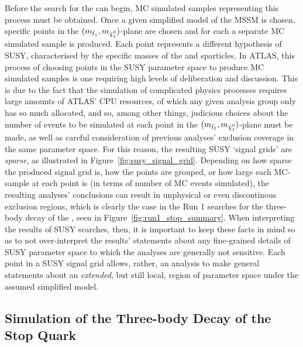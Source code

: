 Before the search for the \stopone can begin, MC simulated samples representing this process
must be obtained.
Once a given simplified model of the MSSM is chosen, specific points in the
$(m_{\stopone}, m_{\ninoone})$-plane are chosen and for each a separate MC simulated
sample is produced.
Each point represents a different hypothesis of SUSY, characterised by the specific masses
of the \stopone and \ninoone sparticles.
In ATLAS, this process of choosing points in the SUSY parameter space to produce MC simulated samples
is one requiring high levels of deliberation and discussion.
This is due to the fact that the simulation of complicated physics processes requires large amounts
of ATLAS' CPU resources, of which any given analysis group only has so much allocated, and so, among other things,
judicious choices about the number of events to be simulated at each point in the $(m_{\stopone}, m_{\ninoone})$-plane
must be made, as well as careful consideration of previous analyses' exclusion coverage in the same parameter space.
For this reason, the resulting SUSY `signal grids' are \textit{sparse}, as illustrated in Figure~\ref{fig:susy_signal_grid}.
Depending on how sparse the produced signal grid is, how the points are grouped, or how large each MC-sample at each
point is (in terms of number of MC events simulated), the resulting analyses' conclusions
can result in unphysical or even discontinous exclusion regions, which is clearly the case in the Run 1 searches
for the three-body decay of the \stopone, seen in Figure~\ref{fig:run1_stop_summary}.
When interpreting the results of SUSY searches, then, it is important to keep these facts in mind
so as to not over-interpret the results' statements about any fine-grained details of SUSY parameter space to
which the analyses are generally not sensitive.
Each point in a SUSY signal grid allows, rather, an analysis to make general statements about
an \textit{extended}, but still local, region of parameter space under the assumed simplified model.


\subsection{Simulation of the Three-body Decay of the Stop Quark}
\label{sec:stop_sim}

